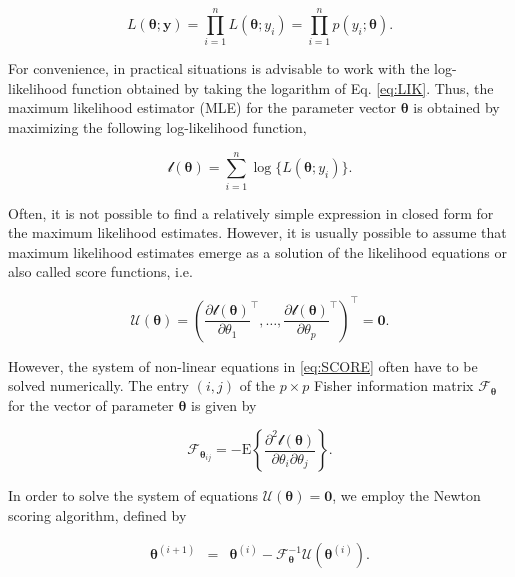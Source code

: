 \documentclass[9pt,a5paper,]{book}
\theoremstyle{definition}
\theoremstyle{definition}
\theoremstyle{remark}
\begin{document}
\begin{equation}
L(\boldsymbol{\theta};\boldsymbol{y}) = \prod_{i=1}^n L(\boldsymbol{\theta}; y_i) = \prod_{i=1}^n p(y_i; \boldsymbol{\theta}).
\label{eq:LIK}
\end{equation}

For convenience, in practical situations is advisable to work with the
log-likelihood function obtained by taking the logarithm of Eq.
\eqref{eq:LIK}. Thus, the maximum likelihood estimator (MLE) for the
parameter vector \(\boldsymbol{\theta}\) is obtained by maximizing the
following log-likelihood function,

\begin{equation}
\mathcal{l}(\boldsymbol{\theta})=\sum^n_{i=1} \log\{ L(\boldsymbol{\theta}; y_i) \}.
\label{eq:LOGLIK}
\end{equation}

Often, it is not possible to find a relatively simple expression in
closed form for the maximum likelihood estimates. However, it is usually
possible to assume that maximum likelihood estimates emerge as a
solution of the likelihood equations or also called score functions,
i.e.

\begin{equation}
\mathcal{U}(\boldsymbol{\theta}) = \left ( \frac{\partial \mathcal{l}(\boldsymbol{\theta})}{\partial \theta_1}^\top, \ldots, \frac{\partial \mathcal{l}(\boldsymbol{\theta})}{\partial \theta_p}^\top \right )^\top = \boldsymbol{0}.
\label{eq:SCORE}
\end{equation}

However, the system of non-linear equations in \eqref{eq:SCORE} often have
to be solved numerically. The entry \((i,j)\) of the \(p \times p\)
Fisher information matrix \(\mathcal{F}_{\boldsymbol{\theta}}\) for the
vector of parameter \(\boldsymbol{\theta}\) is given by

\begin{equation}
\mathcal{F}_{\boldsymbol{\theta}_{ij}} =-\mathrm{E} \left \{ \frac{\partial^2 \mathcal{l}(\boldsymbol{\theta})}{\partial\theta_i\partial\theta_j} \right \}.
\end{equation}

In order to solve the system of equations
\(\mathcal{U}(\boldsymbol{\theta}) = \boldsymbol{0}\), we employ the
Newton scoring algorithm, defined by

\begin{eqnarray}
\boldsymbol{\theta}^{(i+1)} &=& \boldsymbol{\theta}^{(i)} - \mathcal{F}_{\boldsymbol{\theta}}^{-1} \mathcal{U}(\boldsymbol{\theta}^{(i)}). 
\end{eqnarray}
\end{document}
